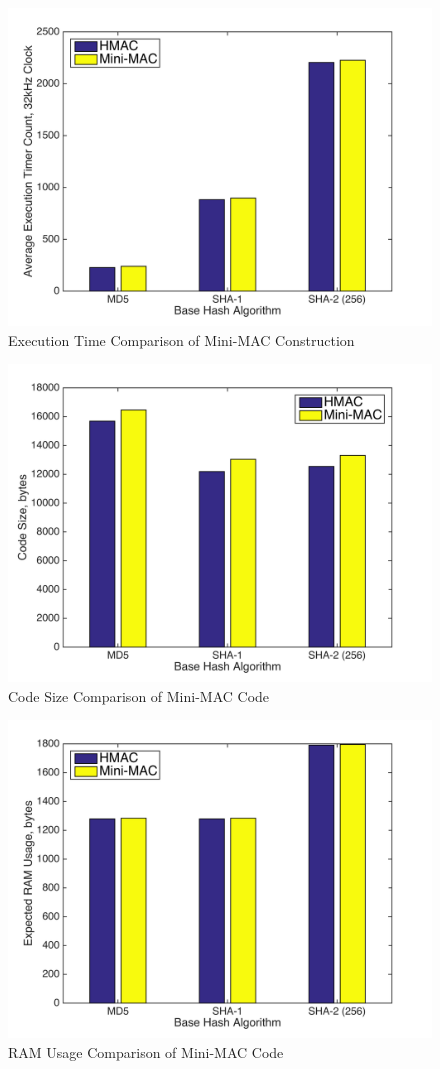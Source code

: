 	\begin{figure}
		\centering
		\includegraphics[width=\columnwidth]{figures/exec_cycles.png}
		\caption{Execution Time Comparison of Mini-MAC Construction}
	\end{figure}
	
	\begin{figure}
		\centering
		\includegraphics[width=\columnwidth]{figures/code_size.png}
		\caption{Code Size Comparison of Mini-MAC Code}
	\end{figure}
	
	\begin{figure}
		\centering
		\includegraphics[width=\columnwidth]{figures/ram_usage.png}
		\caption{RAM Usage Comparison of Mini-MAC Code}
	\end{figure}
	